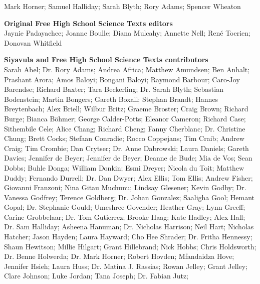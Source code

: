 Mark Horner; Samuel Halliday; Sarah Blyth; Rory Adams; Spencer Wheaton \par 


\textbf{\LARGE Original Free High School Science Texts editors}\\

Jaynie Padayachee; Joanne Boulle; Diana Mulcahy; Annette Nell; René Toerien; Donovan Whitfield \par

\textbf{\LARGE Siyavula and Free High School Science Texts contributors}\\

    Sarah Abel;
Dr. Rory Adams;
    Andrea Africa;
    Matthew Amundsen;
    Ben Anhalt;
    Prashant Arora;
    Amos Baloyi;
    Bongani Baloyi;
    Raymond Barbour;
    Caro-Joy Barendse;
    Richard Baxter;
    Tara Beckerling;
Dr. Sarah Blyth;
    Sebastian Bodenstein;
    Martin Bongers;
    Gareth Boxall;
    Stephan Brandt;
    Hannes Breytenbach;
    Alex Briell;
    Wilbur Britz;
    Graeme Broster;
    Craig Brown;
    Richard Burge;
    Bianca Böhmer;
    George Calder-Potts;
    Eleanor Cameron;
    Richard Case;
    Sithembile Cele;
    Alice Chang;
    Richard Cheng;
    Fanny Cherblanc;
Dr. Christine Chung;
    Brett Cocks;
    Stefaan Conradie;
    Rocco Coppejans;
    Tim Craib;
    Andrew Craig;
    Tim Crombie;
    Dan Crytser;
Dr. Anne Dabrowski;
    Laura Daniels;
    Gareth Davies;
    Jennifer de Beyer;
    Jennifer de Beyer;
    Deanne de Bude;
    Mia de Vos;
    Sean Dobbs;
    Buhle Donga;
    William Donkin;
    Esmi Dreyer;
    Nicola du Toit;
    Matthew Duddy;
    Fernando Durrell;
Dr. Dan Dwyer;
    Alex Ellis;
    Tom Ellis;
    Andrew Fisher;
    Giovanni Franzoni;
    Nina Gitau Muchunu;
    Lindsay Glesener;
    Kevin Godby;
Dr. Vanessa Godfrey;
    Terence Goldberg;
Dr. Johan Gonzalez;
    Saaligha Gool;
    Hemant Gopal;
Dr. Stephanie Gould;
    Umeshree Govender;
    Heather Gray;
    Lynn Greeff;
    Carine Grobbelaar;
Dr. Tom Gutierrez;
    Brooke Haag;
    Kate Hadley;
    Alex Hall;
Dr. Sam Halliday;
    Asheena Hanuman;
Dr. Nicholas Harrison;
    Neil Hart;
    Nicholas Hatcher;
    Jason Hayden;
    Laura Hayward;
    Cho Hee Shrader;
Dr. Fritha Hennessy;
    Shaun Hewitson;
    Millie Hilgart;
    Grant Hillebrand;
    Nick Hobbs;
    Chris Holdsworth;
Dr. Benne Holwerda;
Dr. Mark Horner;
    Robert Hovden;
    Mfandaidza Hove;
    Jennifer Hsieh;
    Laura Huss;
Dr. Matina J. Rassias;
    Rowan Jelley;
    Grant Jelley;
    Clare Johnson;
    Luke Jordan;
    Tana Joseph;
Dr. Fabian Jutz;
